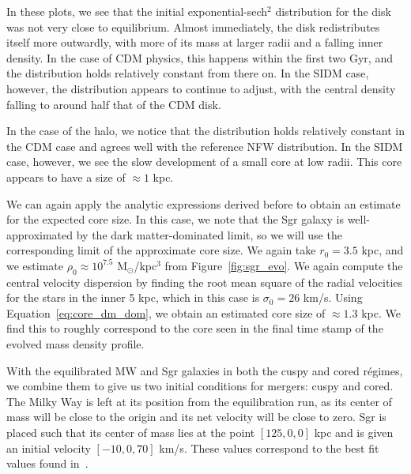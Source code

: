 In these plots, we see that the initial exponential-sech$^2$ distribution for
the disk was not very close to equilibrium. Almost immediately, the disk
redistributes itself more outwardly, with more of its mass at larger radii and a
falling inner density. In the case of CDM physics, this happens within the first
two Gyr, and the distribution holds relatively constant from there on. In the
SIDM case, however, the distribution appears to continue to adjust, with the
central density falling to around half that of the CDM disk.

In the case of the halo, we notice that the distribution holds relatively
constant in the CDM case and agrees well with the reference NFW distribution. In
the SIDM case, however, we see the slow development of a small core at low
radii. This core appears to have a size of $\approx 1$ kpc. 

We can again apply the analytic expressions derived before to obtain an
estimate for the expected core size.  In this case, we note that the Sgr
galaxy is well-approximated by the dark matter-dominated limit, so we will use
the corresponding limit of the approximate core size.  We again take $r_0 =
3.5$ kpc, and we estimate $\rho_0 \approx 10^{7.5}$ M$_\odot$/kpc$^3$ from
Figure~\ref{fig:sgr_evo}.  We again compute the central velocity dispersion by
finding the root mean square of the radial velocities for the stars in the
inner 5 kpc, which in this case is $\sigma_0 = 26$ km/s.  Using
Equation~\ref{eq:core_dm_dom}, we obtain an estimated core size of $\approx
1.3$ kpc.  We find this to roughly correspond to the core seen in the final
time stamp of the evolved mass density profile.

With the equilibrated MW and Sgr galaxies in both the cuspy and cored régimes,
we combine them to give us two initial conditions for mergers: cuspy and
cored. The Milky Way is left at its position from the equilibration run, as
its center of mass will be close to the origin and its net velocity will be
close to zero. Sgr is placed such that its center of mass lies at the point
\([125, 0, 0]\) kpc and is given an initial velocity \([-10,0,70]\) km/s.
These values correspond to the best fit values found
in~\cite{dierickx_predicted_2017}.
